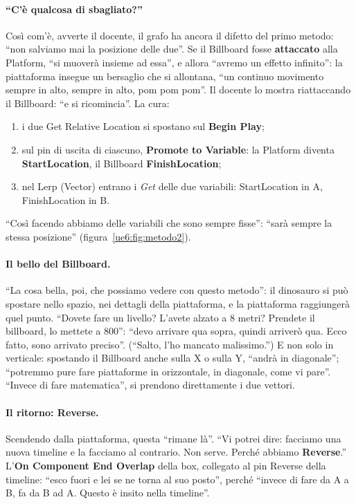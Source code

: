 \paragraph{``C'è qualcosa di sbagliato?''} Così com'è, avverte il docente, il grafo ha
ancora il difetto del primo metodo: ``non salviamo mai la posizione delle due''. Se il
Billboard fosse \textbf{attaccato} alla Platform, ``si muoverà insieme ad essa'', e
allora ``avremo un effetto infinito'': la piattaforma insegue un bersaglio che si
allontana, ``un continuo movimento sempre in alto, sempre in alto, pom pom pom''. Il
docente lo mostra riattaccando il Billboard: ``e si ricomincia''. La cura:
\begin{enumerate}
  \item i due Get Relative Location si spostano sul \textbf{Begin Play};
  \item sul pin di uscita di ciascuno, \textbf{Promote to Variable}: la Platform diventa
        \textbf{StartLocation}, il Billboard \textbf{FinishLocation};
  \item nel Lerp (Vector) entrano i \emph{Get} delle due variabili: StartLocation in A,
        FinishLocation in B.
\end{enumerate}
``Così facendo abbiamo delle variabili che sono sempre fisse'': ``sarà sempre la stessa
posizione'' (figura~\ref{ue6:fig:metodo2}).

\paragraph{Il bello del Billboard.} ``La cosa bella, poi, che possiamo vedere con questo
metodo'': il dinosauro si può spostare nello spazio, nei dettagli della piattaforma, e la
piattaforma raggiungerà quel punto. ``Dovete fare un livello? L'avete alzato a 8 metri?
Prendete il billboard, lo mettete a 800'': ``devo arrivare qua sopra, quindi arriverò
qua. Ecco fatto, sono arrivato preciso''. (``Salto, l'ho mancato malissimo.'') E non solo
in verticale: spostando il Billboard anche sulla X o sulla Y, ``andrà in diagonale'';
``potremmo pure fare piattaforme in orizzontale, in diagonale, come vi pare''. ``Invece
di fare matematica'', si prendono direttamente i due vettori.

\paragraph{Il ritorno: Reverse.} Scendendo dalla piattaforma, questa ``rimane là''.
``Vi potrei dire: facciamo una nuova timeline e la facciamo al contrario. Non serve.
Perché abbiamo \textbf{Reverse}.'' L'\textbf{On Component End Overlap} della box,
collegato al pin Reverse della timeline: ``esco fuori e lei se ne torna al suo posto'',
perché ``invece di fare da A a B, fa da B ad A. Questo è insito nella timeline''.

